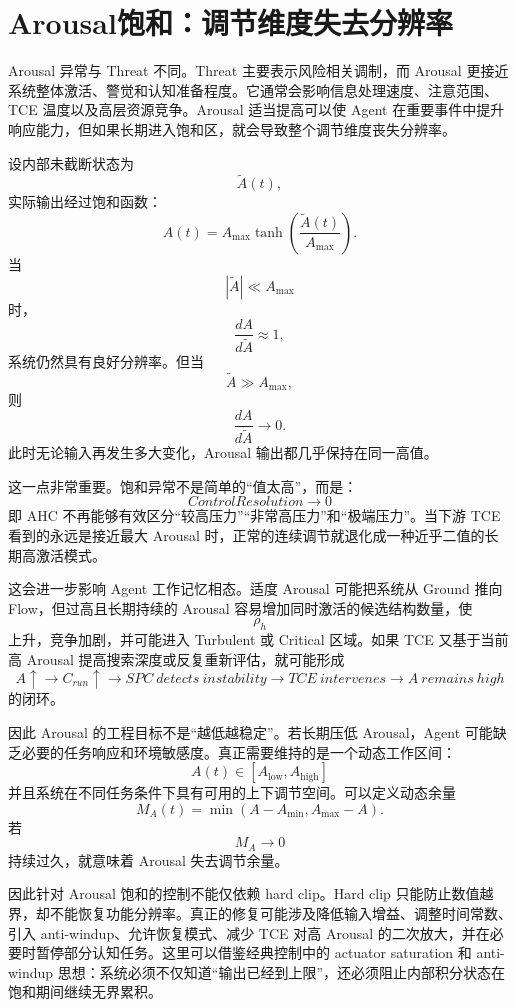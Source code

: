\section{Arousal饱和：调节维度失去分辨率}
\label{sec:ahc_arousal_saturation}

Arousal 异常与 Threat 不同。Threat 主要表示风险相关调制，而 Arousal 更接近系统整体激活、警觉和认知准备程度。它通常会影响信息处理速度、注意范围、TCE 温度以及高层资源竞争。Arousal 适当提高可以使 Agent 在重要事件中提升响应能力，但如果长期进入饱和区，就会导致整个调节维度丧失分辨率。

设内部未截断状态为
\[
\tilde A(t),
\]
实际输出经过饱和函数：
\[
A(t)
=
A_{\max}
\tanh
\left(
\frac{\tilde A(t)}{A_{\max}}
\right).
\]
当
\[
|\tilde A|
\ll A_{\max}
\]
时，
\[
\frac{dA}{d\tilde A}\approx1,
\]
系统仍然具有良好分辨率。但当
\[
\tilde A\gg A_{\max},
\]
则
\[
\frac{dA}{d\tilde A}\rightarrow0.
\]
此时无论输入再发生多大变化，Arousal 输出都几乎保持在同一高值。

这一点非常重要。饱和异常不是简单的“值太高”，而是：
\[
\boxed{
ControlResolution\rightarrow0
}
\]
即 AHC 不再能够有效区分“较高压力”“非常高压力”和“极端压力”。当下游 TCE 看到的永远是接近最大 Arousal 时，正常的连续调节就退化成一种近乎二值的长期高激活模式。

这会进一步影响 Agent 工作记忆相态。适度 Arousal 可能把系统从 Ground 推向 Flow，但过高且长期持续的 Arousal 容易增加同时激活的候选结构数量，使
\[
\rho_h
\]
上升，竞争加剧，并可能进入 Turbulent 或 Critical 区域。如果 TCE 又基于当前高 Arousal 提高搜索深度或反复重新评估，就可能形成
\[
A\uparrow
\rightarrow
C_{run}\uparrow
\rightarrow
SPC\ detects\ instability
\rightarrow
TCE\ intervenes
\rightarrow
A\ remains\ high
\]
的闭环。

因此 Arousal 的工程目标不是“越低越稳定”。若长期压低 Arousal，Agent 可能缺乏必要的任务响应和环境敏感度。真正需要维持的是一个动态工作区间：
\[
A(t)\in
[A_{\mathrm{low}},A_{\mathrm{high}}]
\]
并且系统在不同任务条件下具有可用的上下调节空间。可以定义动态余量
\[
M_A(t)
=
\min
\left(
A-A_{\min},
A_{\max}-A
\right).
\]
若
\[
M_A\rightarrow0
\]
持续过久，就意味着 Arousal 失去调节余量。

因此针对 Arousal 饱和的控制不能仅依赖 hard clip。Hard clip 只能防止数值越界，却不能恢复功能分辨率。真正的修复可能涉及降低输入增益、调整时间常数、引入 anti-windup、允许恢复模式、减少 TCE 对高 Arousal 的二次放大，并在必要时暂停部分认知任务。这里可以借鉴经典控制中的 actuator saturation 和 anti-windup 思想：系统必须不仅知道“输出已经到上限”，还必须阻止内部积分状态在饱和期间继续无界累积。

